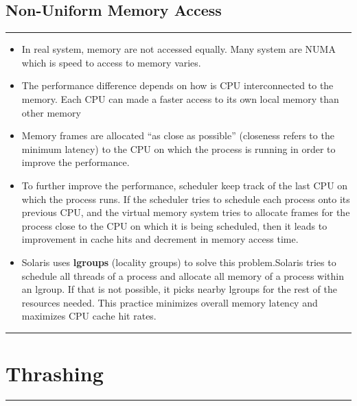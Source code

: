 \documentclass[12pt,onecolumn]{IEEEtran}
\begin{document}
\subsection{Non-Uniform Memory Access}
\hrule
\vspace{3mm}

\begin{itemize}
	\item In real system, memory are not accessed equally. Many system are NUMA which is speed to access to memory varies.
	\item The performance difference depends on how is CPU interconnected to the memory. Each CPU can made a faster access to its own local memory than other memory
	\begin{center}
	\end{center}
	\item Memory frames are allocated “as close as possible” (closeness refers to the minimum latency) to the CPU on which the process is running in order to improve the performance.
	\item To further improve the performance, scheduler keep track of the last CPU on which the process runs. If the scheduler tries to schedule each process onto
	its previous CPU, and the virtual memory system tries to allocate frames for
	the process close to the CPU on which it is being scheduled, then it leads to improvement in
	cache hits and decrement in memory access time.
	\item Solaris uses \textbf{lgroups} (locality groups) to solve this problem.Solaris tries to schedule all threads
	of a process and allocate all memory of a process within an lgroup. If that is
	not possible, it picks nearby lgroups for the rest of the resources needed. This
	practice minimizes overall memory latency and maximizes CPU cache hit rates.
\end{itemize}



















\rule{\textwidth}{0.4mm}  
\section{Thrashing}
\rule{\textwidth}{0.4mm}  
\end{document}
